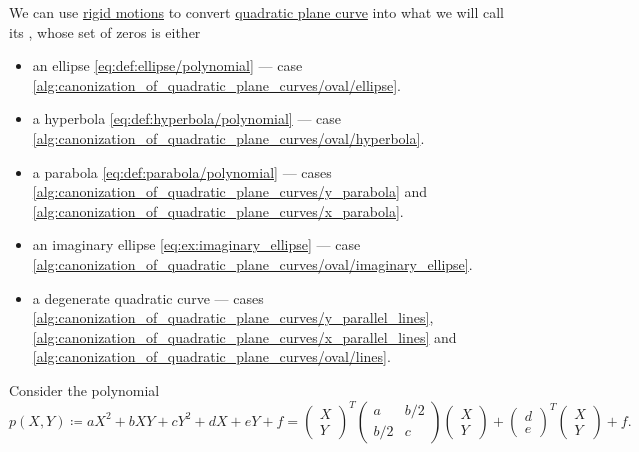 \begin{algorithm}\label{alg:canonization_of_quadratic_plane_curves}
  We can use \hyperref[def:rigid_motion]{rigid motions} to convert \hyperref[def:quadratic_plane_curve]{quadratic plane curve} into what we will call its , whose set of zeros is either
  \begin{itemize}
    \item an ellipse \eqref{eq:def:ellipse/polynomial} --- case \cref{alg:canonization_of_quadratic_plane_curves/oval/ellipse}.
    \item a hyperbola \eqref{eq:def:hyperbola/polynomial} --- case \cref{alg:canonization_of_quadratic_plane_curves/oval/hyperbola}.
    \item a parabola \eqref{eq:def:parabola/polynomial} --- cases \cref{alg:canonization_of_quadratic_plane_curves/y_parabola} and \cref{alg:canonization_of_quadratic_plane_curves/x_parabola}.
    \item an imaginary ellipse \eqref{eq:ex:imaginary_ellipse} --- case \cref{alg:canonization_of_quadratic_plane_curves/oval/imaginary_ellipse}.
    \item a degenerate quadratic curve --- cases \cref{alg:canonization_of_quadratic_plane_curves/y_parallel_lines},
  \cref{alg:canonization_of_quadratic_plane_curves/x_parallel_lines} and \cref{alg:canonization_of_quadratic_plane_curves/oval/lines}.
  \end{itemize}

  Consider the polynomial
  \begin{equation*}
    p(X, Y)
    \coloneqq
    a X^2 + b XY + c Y^2 + d X + e Y + f
    =
    \begin{pmatrix}
      X \\ Y
    \end{pmatrix}^T
    \begin{pmatrix}
      a          & b / 2 \\
      b / 2 & c
    \end{pmatrix}
    \begin{pmatrix}
      X \\ Y
    \end{pmatrix}
    +
    \begin{pmatrix}
      d \\ e
    \end{pmatrix}^T
    \begin{pmatrix}
      X \\ Y
    \end{pmatrix}
    +
    f.
  \end{equation*}


\end{algorithm}
